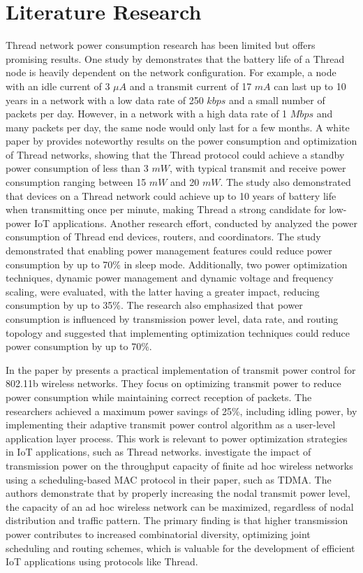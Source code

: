 \section{Literature Research}\label{sec:literature_research}

Thread network power consumption research has been limited but offers promising results. One study by \textcite{semiconductor_battery_2021} demonstrates that the battery life of a Thread node is heavily dependent on the network configuration. For example, a node with an idle current of 3 $\mu A$ and a transmit current of 17 $mA$ can last up to 10 years in a network with a low data rate of 250 $kbps$ and a small number of packets per day. However, in a network with a high data rate of 1 $Mbps$ and many packets per day, the same node would only last for a few months. A white paper by \textcite{Thread_Low_Power_2018} provides noteworthy results on the power consumption and optimization of Thread networks, showing that the Thread protocol could achieve a standby power consumption of less than 3 $mW$, with typical transmit and receive power consumption ranging between 15 $mW$ and 20 $mW$. The study also demonstrated that devices on a Thread network could achieve up to 10 years of battery life when transmitting once per minute, making Thread a strong candidate for low-power \gls{IoT} applications. Another research effort, conducted by \textcite{azoidou2017battery} analyzed the power consumption of Thread end devices, routers, and coordinators. The study demonstrated that enabling power management features could reduce power consumption by up to 70\% in sleep mode. Additionally, two power optimization techniques, dynamic power management and dynamic voltage and frequency scaling, were evaluated, with the latter having a greater impact, reducing consumption by up to 35\%. The research also emphasized that power consumption is influenced by transmission power level, data rate, and routing topology and suggested that implementing optimization techniques could reduce power consumption by up to 70\%.

In the paper by \textcite{sheth2002implementation} presents a practical implementation of transmit power control for 802.11b wireless networks. They focus on optimizing transmit power to reduce power consumption while maintaining correct reception of packets. The researchers achieved a maximum power savings of 25\%, including idling power, by implementing their adaptive transmit power control algorithm as a user-level application layer process. This work is relevant to power optimization strategies in \gls{IoT} applications, such as Thread networks. \textcite{1576539} investigate the impact of transmission power on the throughput capacity of finite ad hoc wireless networks using a scheduling-based \gls{MAC} protocol in their paper, such as \gls{TDMA}. The authors demonstrate that by properly increasing the nodal transmit power level, the capacity of an ad hoc wireless network can be maximized, regardless of nodal distribution and traffic pattern. The primary finding is that higher transmission power contributes to increased combinatorial diversity, optimizing joint scheduling and routing schemes, which is valuable for the development of efficient \gls{IoT} applications using protocols like Thread.

